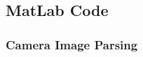 \subsection{MatLab Code}
\subsubsection{Camera Image Parsing} \label{camTestMatlab}
\singlespacing

\doublespacing
